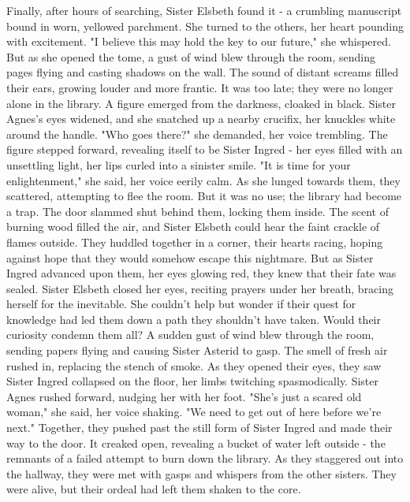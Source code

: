 \documentclass[11pt]{article}
\begin{document}
Finally, after hours of searching, Sister Elsbeth found it - a crumbling manuscript bound in worn, yellowed parchment. She turned to the others, her heart pounding with excitement. "I believe this may hold the key to our future," she whispered.
But as she opened the tome, a gust of wind blew through the room, sending pages flying and casting shadows on the wall. The sound of distant screams filled their ears, growing louder and more frantic. It was too late; they were no longer alone in the library.
A figure emerged from the darkness, cloaked in black. Sister Agnes's eyes widened, and she snatched up a nearby crucifix, her knuckles white around the handle. "Who goes there?" she demanded, her voice trembling.
The figure stepped forward, revealing itself to be Sister Ingred - her eyes filled with an unsettling light, her lips curled into a sinister smile. "It is time for your enlightenment," she said, her voice eerily calm.
As she lunged towards them, they scattered, attempting to flee the room. But it was no use; the library had become a trap. The door slammed shut behind them, locking them inside. The scent of burning wood filled the air, and Sister Elsbeth could hear the faint crackle of flames outside.
They huddled together in a corner, their hearts racing, hoping against hope that they would somehow escape this nightmare. But as Sister Ingred advanced upon them, her eyes glowing red, they knew that their fate was sealed.
Sister Elsbeth closed her eyes, reciting prayers under her breath, bracing herself for the inevitable. She couldn't help but wonder if their quest for knowledge had led them down a path they shouldn't have taken. Would their curiosity condemn them all? 
A sudden gust of wind blew through the room, sending papers flying and causing Sister Asterid to gasp. The smell of fresh air rushed in, replacing the stench of smoke. As they opened their eyes, they saw Sister Ingred collapsed on the floor, her limbs twitching spasmodically.
Sister Agnes rushed forward, nudging her with her foot. "She's just a scared old woman," she said, her voice shaking. "We need to get out of here before we're next."
Together, they pushed past the still form of Sister Ingred and made their way to the door. It creaked open, revealing a bucket of water left outside - the remnants of a failed attempt to burn down the library.
As they staggered out into the hallway, they were met with gasps and whispers from the other sisters. They were alive, but their ordeal had left them shaken to the core.
\end{document}
